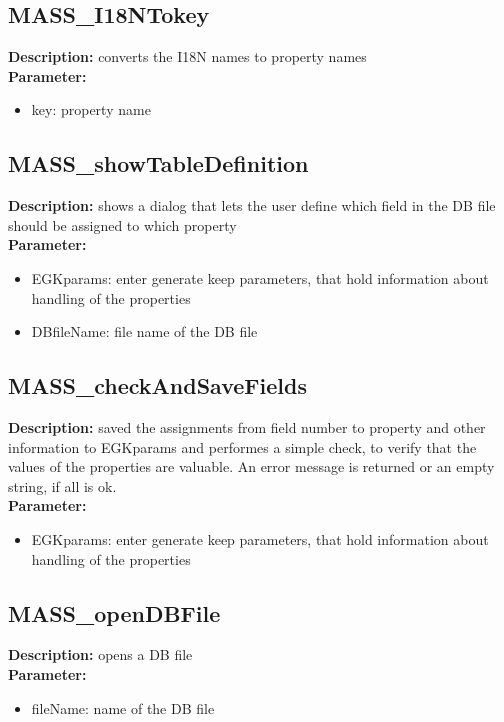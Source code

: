 \subsection{MASS\_I18NTokey}
\textbf{Description:} converts the I18N names to property names\\
\textbf{Parameter:}
\begin{itemize}
\item key: property name
\end{itemize}

\subsection{MASS\_showTableDefinition}
\textbf{Description:} shows a dialog that lets the user define which field in the DB file should be assigned to which property\\
\textbf{Parameter:}
\begin{itemize}
\item EGKparams: enter generate keep parameters, that hold information about handling of the properties
\item DBfileName: file name of the DB file
\end{itemize}

\subsection{MASS\_checkAndSaveFields}
\textbf{Description:} saved the assignments from field number to property and other information to EGKparams and performes a simple check, to verify that the values of the properties are valuable. An error message is returned or an empty string, if all is ok.\\
\textbf{Parameter:}
\begin{itemize}
\item EGKparams: enter generate keep parameters, that hold information about handling of the properties
\end{itemize}

\subsection{MASS\_openDBFile}
\textbf{Description:} opens a DB file\\
\textbf{Parameter:}
\begin{itemize}
\item fileName: name of the DB file
\end{itemize}

